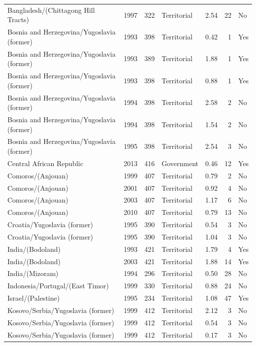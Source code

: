 \begin{longtable}[t]{lrrlrrl}
\endfoot
\bottomrule
\endlastfoot
Bangladesh/(Chittagong Hill Tracts) & 1997 & 322 & Territorial & 2.54 & 22 & No\\
Bosnia and Herzegovina/Yugoslavia (former) & 1993 & 398 & Territorial & 0.42 & 1 & Yes\\
Bosnia and Herzegovina/Yugoslavia (former) & 1993 & 389 & Territorial & 1.88 & 1 & Yes\\
Bosnia and Herzegovina/Yugoslavia (former) & 1993 & 398 & Territorial & 0.88 & 1 & Yes\\
Bosnia and Herzegovina/Yugoslavia (former) & 1994 & 398 & Territorial & 2.58 & 2 & No\\
\addlinespace
Bosnia and Herzegovina/Yugoslavia (former) & 1994 & 398 & Territorial & 1.54 & 2 & No\\
Bosnia and Herzegovina/Yugoslavia (former) & 1995 & 398 & Territorial & 2.54 & 3 & No\\
Central African Republic & 2013 & 416 & Government & 0.46 & 12 & Yes\\
Comoros/(Anjouan) & 1999 & 407 & Territorial & 0.79 & 2 & No\\
Comoros/(Anjouan) & 2001 & 407 & Territorial & 0.92 & 4 & No\\
\addlinespace
Comoros/(Anjouan) & 2003 & 407 & Territorial & 1.17 & 6 & No\\
Comoros/(Anjouan) & 2010 & 407 & Territorial & 0.79 & 13 & No\\
Croatia/Yugoslavia (former) & 1995 & 390 & Territorial & 0.54 & 3 & No\\
Croatia/Yugoslavia (former) & 1995 & 390 & Territorial & 1.04 & 3 & No\\
India/(Bodoland) & 1993 & 421 & Territorial & 1.79 & 4 & Yes\\
\addlinespace
India/(Bodoland) & 2003 & 421 & Territorial & 1.88 & 14 & Yes\\
India/(Mizoram) & 1994 & 296 & Territorial & 0.50 & 28 & No\\
Indonesia/Portugal/(East Timor) & 1999 & 330 & Territorial & 0.88 & 24 & No\\
Israel/(Palestine) & 1995 & 234 & Territorial & 1.08 & 47 & Yes\\
Kosovo/Serbia/Yugoslavia (former) & 1999 & 412 & Territorial & 2.12 & 3 & No\\
\addlinespace
Kosovo/Serbia/Yugoslavia (former) & 1999 & 412 & Territorial & 0.54 & 3 & No\\
Kosovo/Serbia/Yugoslavia (former) & 1999 & 412 & Territorial & 0.17 & 3 & No\\

\end{longtable}
